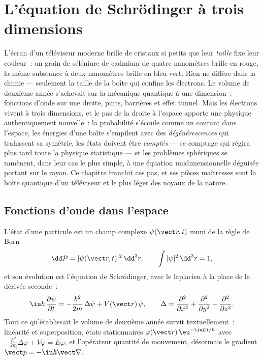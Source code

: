 \chapter{L'équation de Schrödinger à trois dimensions}\label{ch:b3:schrodinger-three-dimensions}

L'écran d'un téléviseur moderne brille de cristaux si petits que leur
\emph{taille} fixe leur couleur~: un grain de séléniure de cadmium de
quatre nanomètres brille en rouge, la même substance à deux nanomètres
brille en bleu-vert. Rien ne diffère dans la chimie --- seulement la
taille de la boîte qui confine les électrons. Le volume de deuxième
année s'achevait sur la mécanique quantique à une dimension~: fonctions
d'onde sur une droite, puits, barrières et effet tunnel. Mais les
électrons vivent à trois dimensions, et le pas de la droite à l'espace
apporte une physique authentiquement nouvelle~: la probabilité s'écoule
comme un courant dans l'espace, les énergies d'une boîte s'empilent avec
des \emph{dégénérescences} qui trahissent sa symétrie, les états doivent
être \emph{comptés} --- ce comptage qui régira plus tard toute la
physique statistique --- et les problèmes sphériques se ramènent, dans
leur cas le plus simple, à une équation unidimensionnelle déguisée
portant sur le rayon. Ce chapitre franchit ces pas, et ses pièces
maîtresses sont la boîte quantique d'un téléviseur et le plus léger des
noyaux de la nature.

\section{Fonctions d'onde dans l'espace}

\begin{definition}\label{def:b3:schrodinger-three-dimensions:psi3d}
L'état d'une particule est un champ complexe $\psi(\vect r, t)$ muni de
la règle de Born
\[
\dd\mathcal P = |\psi(\vect r, t)|^2\,\dd^3r , \qquad
\int|\psi|^2\,\dd^3r = 1 ,
\]
et son évolution est l'équation de Schrödinger, avec le laplacien à la
place de la dérivée seconde~:
\[
\iu\hbar\,\frac{\partial\psi}{\partial t}
 = -\frac{\hbar^2}{2m}\,\Delta\psi + V(\vect r)\,\psi ,
\qquad
\Delta = \frac{\partial^2}{\partial x^2} +
\frac{\partial^2}{\partial y^2} + \frac{\partial^2}{\partial z^2} .
\]
Tout ce qu'établissait le volume de deuxième année survit
textuellement~: linéarité et superposition, états stationnaires
$\varphi(\vect r)\,\eu^{-\iu Et/\hbar}$ avec
$-\tfrac{\hbar^2}{2m}\Delta\varphi + V\varphi = E\varphi$, et
l'opérateur quantité de mouvement, désormais le gradient $\hat{\vect p} =
-\iu\hbar\vect\nabla$.
\end{definition}

